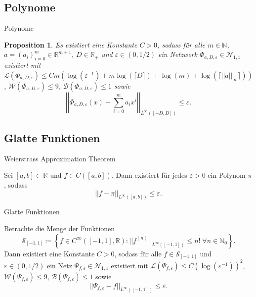 \documentclass[10pt,aspectratio=169]{beamer}
\newtheorem{proposition}[theorem]{Proposition}
\newcommand{\N}{\mathbb{N}} %
\newcommand{\R}{\mathbb{R}} %
\begin{document}
\subsection{Polynome}

\begin{frame}{Polynome}
    \begin{proposition} %
        \newcommand{\Phia}{\Phi_{a,D,\varepsilon}}
        Es existiert eine Konstante \(C>0\), sodass für alle \(m\in \N\), \(a = (a_i)_{i=0}^m \in \R^{m+1}\), 
        \(D\in \R_+\) und \(\varepsilon \in (0,1/2)\) ein Netzwerk \(\Phia \in \mathcal{N}_{1,1}\) 
        existiert mit \(\mathcal{L}(\Phia) \leq C m (\log(\varepsilon^{-1}) + m\log(\lceil D \rceil) + \log(m) + \log(\lceil ||a||_\infty \rceil))\), 
        \(\mathcal{W}(\Phia) \leq 9\), \(\mathcal{B}(\Phia) \leq 1\) sowie 
        \[ \left|\left|\Phia(x) - \sum_{i=0}^m a_i x^i \right|\right|_{L^\infty([-D,D])} \leq \varepsilon. \]
    \end{proposition}
\end{frame}

\subsection{Glatte Funktionen}

\begin{frame}{Weierstrass Approximation Theorem}
    \begin{theorem} %
        Sei \([a,b] \subset \R\) und \(f\in C([a,b])\). Dann existiert für jedes \(\varepsilon > 0\) ein 
        Polynom \(\pi\), sodass 
        \[ ||f - \pi ||_{L^\infty([a,b])} \leq \varepsilon. \]
    \end{theorem}
\end{frame}

\begin{frame}{Glatte Funktionen}
    \begin{lemma} %
        Betrachte die Menge der Funktionen 
        \[ \mathcal{S}_{[-1,1]} \coloneqq \left\{ f \in C^\infty([-1,1], \R): ||f^{(n)}||_{L^\infty([-1,1])} \leq n! \;\forall n \in \N_0 \right\}. \]
        Dann existiert eine Konstante \(C>0\), sodass für alle \(f\in \mathcal{S}_{[-1,1]}\) und \(\varepsilon\in (0,1/2)\) 
        ein Netz \(\Psi_{f,\varepsilon} \in \mathcal{N}_{1,1}\) existiert mit 
        \( \mathcal{L}(\Psi_{f,\varepsilon}) \leq C(\log(\varepsilon^{-1}))^2 \), 
        \(\mathcal{W}(\Psi_{f,\varepsilon}) \leq 9\), \(\mathcal{B}(\Psi_{f,\varepsilon}) \leq 1\) 
        sowie 
        \[ ||\Psi_{f,\varepsilon} - f||_{L^\infty([-1,1])} \leq \varepsilon. \]
    \end{lemma}
\end{frame}
\end{document}
